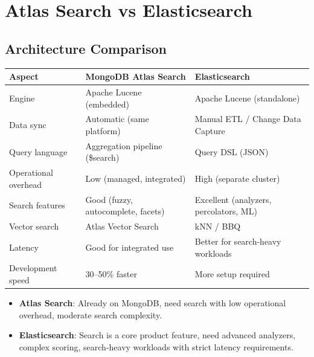 \documentclass[12pt,a4paper]{article}
\begin{document}
\section{Atlas Search vs Elasticsearch}

\subsection{Architecture Comparison}

\begin{center}
\begin{tabular}{lp{5cm}p{5cm}}
\toprule
\textbf{Aspect} & \textbf{MongoDB Atlas Search} & \textbf{Elasticsearch} \\
\midrule
Engine & Apache Lucene (embedded) & Apache Lucene (standalone) \\
Data sync & Automatic (same platform) & Manual ETL / Change Data Capture \\
Query language & Aggregation pipeline (\$search) & Query DSL (JSON) \\
Operational overhead & Low (managed, integrated) & High (separate cluster) \\
Search features & Good (fuzzy, autocomplete, facets) & Excellent (analyzers, percolators, ML) \\
Vector search & Atlas Vector Search & kNN / BBQ \\
Latency & Good for integrated use & Better for search-heavy workloads \\
Development speed & 30--50\% faster & More setup required \\
\bottomrule
\end{tabular}
\end{center}

\begin{tipbox}
\begin{itemize}
    \item \textbf{Atlas Search}: Already on MongoDB, need search with low operational overhead, moderate search complexity.
    \item \textbf{Elasticsearch}: Search is a core product feature, need advanced analyzers, complex scoring, search-heavy workloads with strict latency requirements.
\end{itemize}
\end{tipbox}


\end{document}
